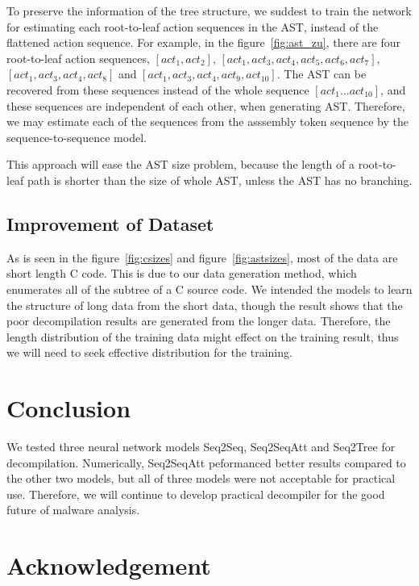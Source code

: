 \documentclass[senior,final,11pt]{iscs-thesis}
\begin{document}
To preserve the information of the tree structure, we suddest to train the network for estimating each root-to-leaf action sequences in the AST,
instead of the flattened action sequence. 
For example, in the figure~\ref{fig:ast_zu}, there are four root-to-leaf action sequences, 
$ [act_1, act_2] $, $ [act_1, act_3,act_4,act_5,act_6,act_7] $, $ [act_1, act_3,act_4,act_8] $ and $ [act_1, act_3,act_4,act_9,act_{10}] $.
The AST can be recovered from these sequences instead of the whole sequence $ [act_1 \dots act_{10}] $, 
and these sequences are independent of each other, when generating AST.
Therefore, we may estimate each of the sequences from the asssembly token sequence by the sequence-to-sequence model.

This approach will ease the AST size problem, because the length of a root-to-leaf path is shorter than the size of whole AST, unless the AST has no branching.







\section{Improvement of Dataset}
As is seen in the figure~\ref{fig:csizes} and figure~\ref{fig:astsizes}, most of the data are short length C code.
This is due to our data generation method, which enumerates all of the subtree of a C source code.
We intended the models to learn the structure of long data from the short data, though the result shows that 
the poor decompilation results are generated from the longer data.
Therefore, the length distribution of the training data might effect on the training result, 
thus we will need to seek effective distribution for the training.





\chapter{Conclusion}
We tested three neural network models Seq2Seq, Seq2SeqAtt and Seq2Tree for decompilation.
Numerically, Seq2SeqAtt peformanced better results compared to the other two models,
but all of three models were not acceptable for practical use.
Therefore, we will continue to develop practical decompiler for the good future of malware analysis.

\chapter{Acknowledgement}



\end{document}

